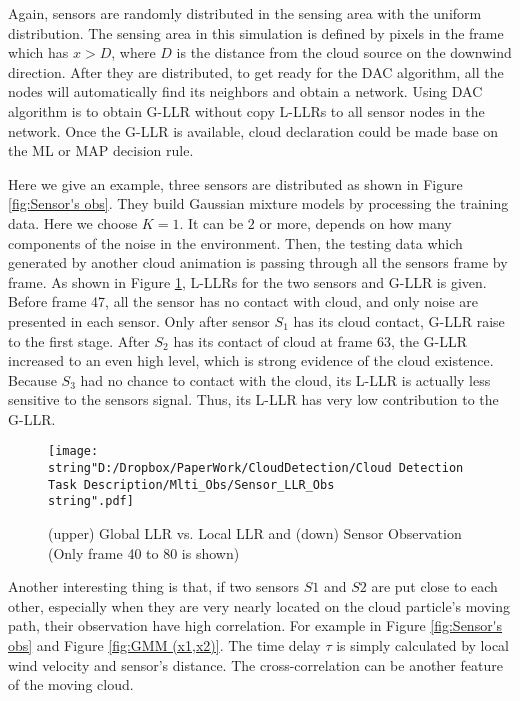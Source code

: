 Again, sensors are randomly distributed in the sensing area with the
uniform distribution. The sensing area in this simulation is defined
by pixels in the frame which has $x>D$, where $D$ is the distance
from the cloud source on the downwind direction. After they are distributed,
to get ready for the DAC algorithm, all the nodes will automatically
find its neighbors and obtain a network. Using DAC algorithm is to
obtain G-LLR without copy L-LLRs to all sensor nodes in the network.
Once the G-LLR is available, cloud declaration could be made base
on the ML or MAP decision rule.

Here we give an example, three sensors are distributed as shown in
Figure \ref{fig:Sensor's obs}. They build Gaussian mixture models
by processing the training data. Here we choose $K=1$. It can be
$2$ or more, depends on how many components of the noise in the environment.
Then, the testing data which generated by another cloud animation
is passing through all the sensors frame by frame. As shown in Figure
\ref{fig:Global-LLR-and}, L-LLRs for the two sensors and G-LLR is
given. Before frame 47, all the sensor has no contact with cloud,
and only noise are presented in each sensor. Only after sensor $S_{1}$
has its cloud contact, G-LLR raise to the first stage. After $S_{2}$
has its contact of cloud at frame 63, the G-LLR increased to an even
high level, which is strong evidence of the cloud existence. Because
$S_{3}$ had no chance to contact with the cloud, its L-LLR is actually
less sensitive to the sensors signal. Thus, its L-LLR has very low
contribution to the G-LLR. 

\begin{figure}
\hfill{}\texttt{[image: \\string"D:/Dropbox/PaperWork/CloudDetection/Cloud Detection Task Description/Mlti\_Obs/Sensor\_LLR\_Obs\\string".pdf]}\hfill{}\hfill{}\caption{\label{fig:Global-LLR-and}(upper) Global LLR vs. Local LLR and (down)
Sensor Observation (Only frame 40 to 80 is shown)}
\end{figure}


Another interesting thing is that, if two sensors $S1$ and $S2$
are put close to each other, especially when they are very nearly
located on the cloud particle's moving path, their observation have
high correlation. For example in Figure \ref{fig:Sensor's obs} and
Figure \ref{fig:GMM (x1,x2)}. The time delay $\tau$ is simply calculated
by local wind velocity and sensor\textquoteright{}s distance. The
cross-correlation can be another feature of the moving cloud.


